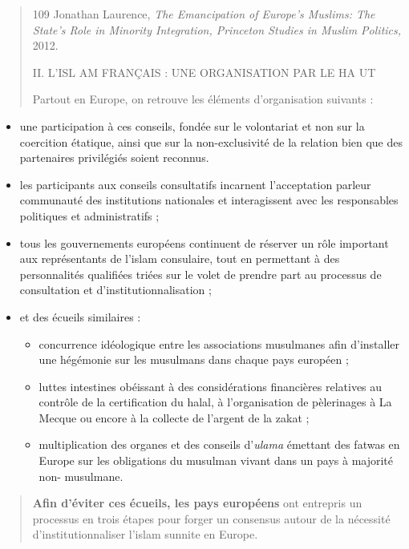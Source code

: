 \begin{quote}
109 Jonathan Laurence, \emph{The Emancipation of Europe's Muslims: The
State's Role in Minority Integration, Princeton Studies in Muslim
Politics,} 2012.

II. L'ISL AM FRANÇAIS : UNE ORGANISATION PAR LE HA UT

Partout en Europe, on retrouve les éléments d'organisation suivants :
\end{quote}

\begin{itemize}
\item
  une participation à ces conseils, fondée sur le volontariat et non sur
  la coercition étatique, ainsi que sur la non-exclusivité de la
  relation bien que des partenaires privilégiés soient reconnus.
\item
  les participants aux conseils consultatifs incarnent l'acceptation
  parleur communauté des institutions nationales et interagissent avec
  les responsables politiques et administratifs ;
\item
  tous les gouvernements européens continuent de réserver un rôle
  important aux représentants de l'islam consulaire, tout en permettant
  à des personnalités qualifiées triées sur le volet de prendre part au
  processus de consultation et d'institutionnalisation ;
\item
  et des écueils similaires :

  \begin{itemize}
  \item
    concurrence idéologique entre les associations musulmanes afin
    d'installer une hégémonie sur les musulmans dans chaque pays
    européen ;
  \item
    luttes intestines obéissant à des considérations financières
    relatives au contrôle de la certification du halal, à l'organisation
    de pèlerinages à La Mecque ou encore à la collecte de l'argent de la
    zakat ;
  \item
    multiplication des organes et des conseils d'\emph{ulama} émettant
    des fatwas en Europe sur les obligations du musulman vivant dans un
    pays à majorité non- musulmane.
  \end{itemize}
\end{itemize}

\begin{quote}
\textbf{Afin d'éviter ces écueils, les pays européens} ont entrepris un
processus en trois étapes pour forger un consensus autour de la
nécessité d'institutionnaliser l'islam sunnite en Europe.
\end{quote}

